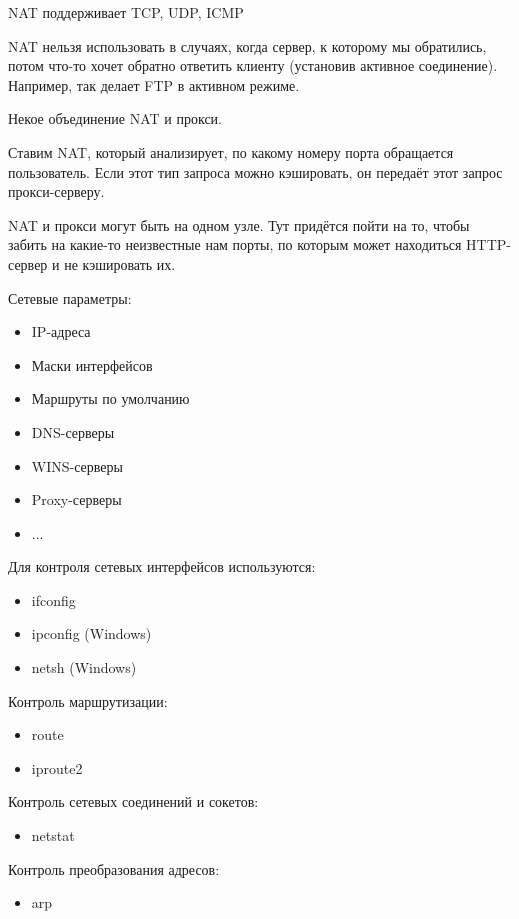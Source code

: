 NAT поддерживает TCP, UDP, ICMP

NAT нельзя использовать в случаях, когда сервер, к которому мы обратились, потом что-то хочет обратно ответить клиенту (установив активное соединение). Например, так делает FTP в активном режиме.


Некое объединение NAT и прокси.

Ставим NAT, который анализирует, по какому номеру порта обращается пользователь. Если этот тип запроса можно кэшировать, он передаёт этот запрос прокси-серверу.

NAT и прокси могут быть на одном узле. Тут придётся пойти на то, чтобы забить на какие-то неизвестные нам порты, по которым может находиться HTTP-сервер и не кэшировать их.


Сетевые параметры:
\begin{itemize}
    \item IP-адреса
    \item Маски интерфейсов
    \item Маршруты по умолчанию
    \item DNS-серверы
    \item WINS-серверы
    \item Proxy-серверы
    \item ...
\end{itemize}

Для контроля сетевых интерфейсов используются:
\begin{itemize}
    \item ifconfig
    \item ipconfig (Windows)
    \item netsh (Windows)
\end{itemize}

Контроль маршрутизации:
\begin{itemize}
    \item route
    \item iproute2
\end{itemize}

Контроль сетевых соединений и сокетов:
\begin{itemize}
    \item netstat
\end{itemize}

Контроль преобразования адресов:
\begin{itemize}
    \item arp
\end{itemize}

